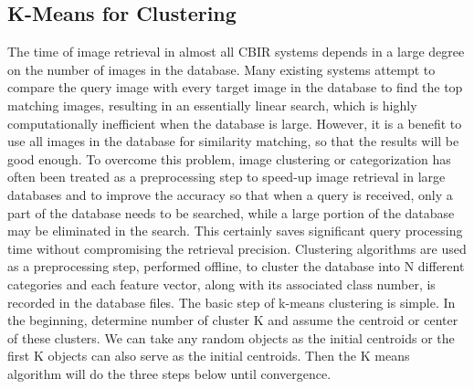 \subsection[K-Means for Clustering ]{K-Means for Clustering }
\noindent
The time of image retrieval in almost all CBIR systems depends in a large degree on the number of images in the database. Many existing systems attempt to compare the query image with every target image in the database to find the top matching images, resulting in an essentially linear search, which is highly computationally inefficient when the database is large. However, it is a benefit to use all images in the database for similarity matching, so that the results will be good enough. To overcome this problem, image clustering or categorization has often been treated as a preprocessing step to speed-up image retrieval in large databases and to improve the accuracy so that when a query is received, only a part of the database needs to be searched, while a large portion of the database may be eliminated in the search. This certainly saves significant query processing time without compromising the retrieval precision. Clustering algorithms are used as a preprocessing step, performed offline, to cluster the database into N different categories and each feature vector, along with its associated class number, is recorded in the database files. 
The basic step of k-means clustering is simple. In the beginning, determine number of cluster K and assume the centroid or center of these clusters. We can take any random objects as the initial centroids or the first K objects can also serve as the initial centroids. Then the K means algorithm will do the three steps below until convergence.

